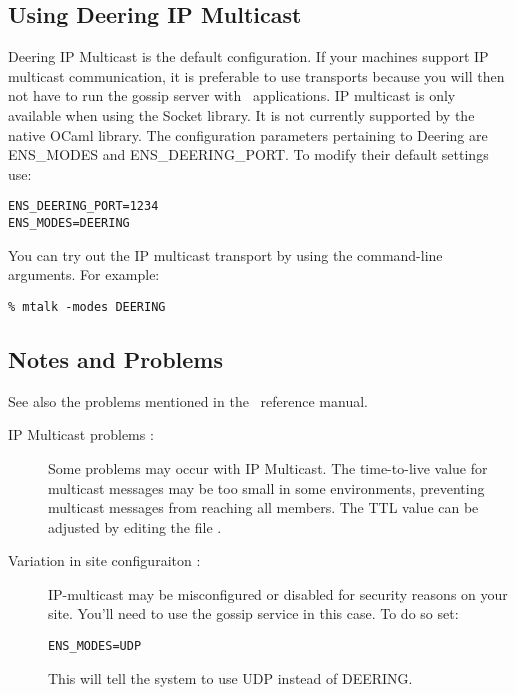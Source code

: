 \subsection{Using Deering IP Multicast}
Deering IP Multicast is the default configuration. If your machines support IP
multicast communication, it is preferable to use 
transports because you will then not have to run the gossip server
with \ensemble\ applications. IP multicast is only available
when using the Socket library. It is not currently supported
by the native OCaml library. The configuration parameters pertaining
to Deering are ENS\_MODES and ENS\_DEERING\_PORT. To modify their
default settings use:
\begin{verbatim}
ENS_DEERING_PORT=1234
ENS_MODES=DEERING
\end{verbatim}
 
You can try out the IP multicast transport by using the command-line arguments.  
For example: 
\begin{verbatim}
% mtalk -modes DEERING
\end{verbatim}

\subsection{Notes and Problems}

See also the problems mentioned in the \ensemble\ reference manual.
\begin{description}
\item
[IP Multicast problems :] Some problems may occur with IP Multicast.
The time-to-live value for multicast messages may be too small in
some environments, preventing multicast messages from reaching all
members. The TTL value can be adjusted by editing the file \newline
{}.
\item
[Variation in site configuraiton :]
IP-multicast may be misconfigured or disabled for security reasons on
your site. You'll need to use the gossip service in this case. To do
so set:
\begin{verbatim}
ENS_MODES=UDP
\end{verbatim}
This will tell the system to use UDP instead of DEERING. 
\end{description}


